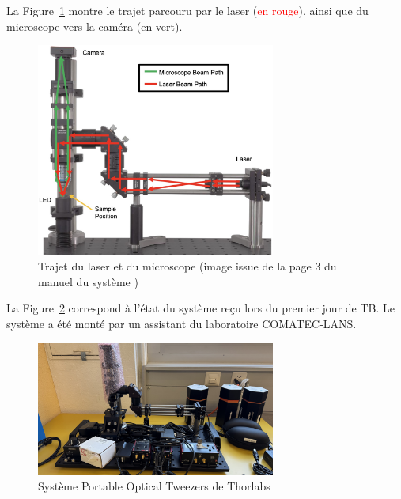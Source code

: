 La Figure~\ref{chemin_laser_caméra} montre le trajet parcouru par le laser (\textcolor{red}{en rouge}), ainsi que du microscope vers la caméra (\textcolor[RGB]{0, 120, 0}{en vert}).
\begin{figure}[H]
    \begin{center}
        \includegraphics[width=0.7\textwidth]{assets/figures/Introduction/chemin_laser_camera.jpeg}
    \end{center}
    \caption{Trajet du laser et du microscope (image issue de la page 3 du manuel du système \cite{manualPortableOpticalTweezers})}
    \label{chemin_laser_caméra}
\end{figure}

La Figure~\ref{kit_vierge} correspond à l'état du système reçu lors du premier jour de TB. Le système a été monté par un assistant du laboratoire COMATEC-LANS.

\begin{figure}[H]
    \begin{center}
        \includegraphics[width=0.7\textwidth]{assets/figures/Introduction/kit_vierge.jpeg}
    \end{center}
    \caption{Système Portable Optical Tweezers de Thorlabs}
    \label{kit_vierge}
\end{figure}

